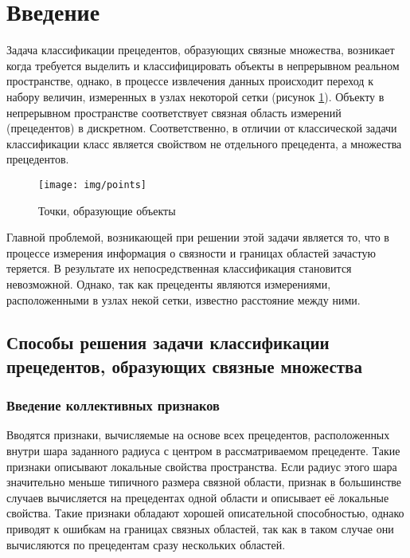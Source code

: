 \newpage
\section{Введение}


Задача классификации прецедентов, образующих связные множества, возникает когда требуется выделить и классифицировать объекты в непрерывном реальном пространстве, однако, в процессе извлечения данных происходит переход к набору величин, измеренных в узлах некоторой сетки (рисунок \ref{points}). Объекту в непрерывном пространстве соответствует связная область измерений (прецедентов) в дискретном. Соответственно, в отличии от классической задачи классификации класс является свойством не отдельного прецедента, а множества прецедентов. 

\begin{figure}[!b]
\begin{center}
\texttt{[image: img/points]}
\end{center}
\caption{Точки, образующие объекты}
\label{points}
\end{figure}

Главной проблемой, возникающей при решении этой задачи является то, что в процессе измерения информация о связности и границах областей зачастую теряется. В результате их непосредственная классификация становится невозможной. Однако, так как прецеденты являются измерениями, расположенными в узлах некой сетки, известно расстояние между ними.

\subsection{Способы решения задачи классификации прецедентов, образующих связные множества}
\subsubsection{Введение коллективных признаков}
Вводятся признаки, вычисляемые на основе всех прецедентов, расположенных внутри шара заданного радиуса с центром в рассматриваемом прецеденте. Такие признаки описывают локальные свойства пространства. Если радиус этого шара значительно меньше типичного размера связной области, признак в большинстве случаев вычисляется на прецедентах одной области и описывает её локальные свойства. Такие признаки обладают хорошей описательной способностью\cite{Amin}, однако приводят к ошибкам на границах связных областей, так как в таком случае они вычисляются по прецедентам сразу нескольких областей.

